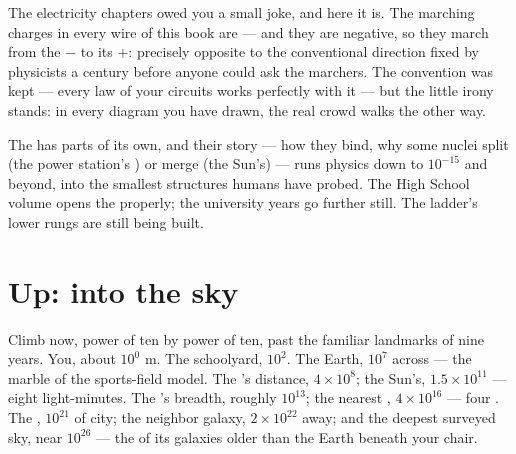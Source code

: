 \begin{example}\label{ex:g9:atoms-to-galaxies:electron}
The electricity chapters owed you a small joke, and here it
is. The marching charges in every wire of this book are
\emph{} --- and they are negative, so they march
from the  $-$  to its $+$: precisely
opposite to the conventional direction fixed by physicists a
century before anyone could ask the marchers. The convention
was kept --- every law of your circuits works perfectly with
it --- but the little irony stands: in every diagram you have
drawn, the real crowd walks the other way.
\end{example}

\begin{example}\label{ex:g9:atoms-to-galaxies:deeper}
The  has parts of its own, and their story --- how
they bind, why some nuclei split (the power station's )
or merge (the Sun's) --- runs physics down to $10^{-15}$
 and beyond, into the smallest structures humans have
probed. The High School volume opens the  properly;
the university years go further still. The ladder's lower
rungs are still being built.
\end{example}

\section{Up: into the sky}

\begin{example}\label{ex:g9:atoms-to-galaxies:ascent}
Climb now, power of ten by power of ten, past the familiar
landmarks of nine years. You, about $10^{0}$ \unit{m}. The
schoolyard, $10^{2}$. The Earth, $10^{7}$ across --- the
marble of the sports-field model. The 's distance,
$4 \times 10^{8}$; the Sun's, $1.5 \times 10^{11}$ --- eight
light-minutes. The 's breadth, roughly
$10^{13}$; the nearest , $4 \times 10^{16}$ --- four
. The , $10^{21}$  of city; the
neighbor galaxy, $2 \times 10^{22}$ away; and the deepest
surveyed sky, near $10^{26}$  --- the  of its
galaxies older than the Earth beneath your chair.
\end{example}

